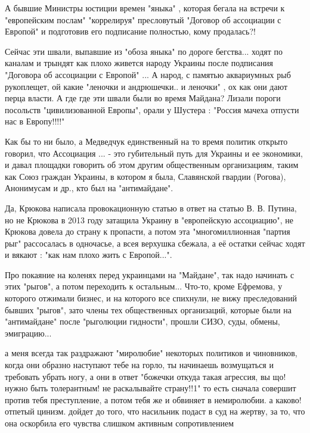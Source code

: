 \begin{itemize}
\begin{itemize}
А бывшие Министры юстиции времен "яныка" , которая бегала на встречи к
"европейским послам" "коррелируя" пресловутый "Договор об ассоциации с Европой"
и подготовив его подписание полностью, кому продалась?! 

Сейчас эти швали, выпавшие из "обоза яныка" по дороге бегства...  ходят по
каналам и трындят как плохо живется народу Украины после подписания "Договора
об ассоциации с Европой" ... А народ, с памятью аквариумных рыб рукоплещет, ой
какие "леночки и андрюшечки.. и леночки" , ох как они дают перца власти. А где
где эти швали были во время Майдана? Лизали пороги посольств "цивилизованной
Европы", орали у Шустера : "Россия мачеха отпусти нас в Европу!!!!" 

Как бы то ни было, а Медведчук единственный на то время политик открыто
говорил, что Ассоциация ... - это губительный путь для Украины и ее экономики,
и давал площадки говорить об этом другим общественным организациям, таким как
Союз граждан Украины, в котором я была, Славянской гвардии (Рогова), Анонимусам
и др., кто был на "антимайдане". 

Да, Крюкова написала провокационную статью в ответ на статью В. В. Путина, но
не Крюкова в 2013 году затащила Украину в "европейскую ассоциацию", не Крюкова
довела до страну к пропасти, а потом эта "многомиллионная "партия рыг"
рассосалась в одночасье, а всея верхушка сбежала, а её остатки сейчас ходят и
вякают : "как нам плохо жить с Европой...". 

Про покаяние на коленях перед украинцами на "Майдане", так надо начинать с этих
"рыгов", а потом переходить к остальным... Что-то, кроме Ефремова, у которого
отжимали бизнес, и на которого все спихнули, не вижу преследований бывших
"рыгов", зато члены тех общественных организаций, которые были на "антимайдане"
после "рыголюции гидности", прошли СИЗО, суды, обмены, эмиграцию...

\end{itemize}

 

а меня всегда так раздражают "миролюбие" некоторых политиков и чиновников,
когда они образно наступают тебе на горло, ты начинаешь возмущаться и требовать
убрать ногу, а они в ответ "божечки откуда такая агрессия, вы що! нужно быть
толерантным! не раскалывайте страну!!1" то есть сначала совершит против тебя
преступление, а потом тебя же и обвиняет в немиролюбии. а каково! отпетый
цинизм. дойдет до того, что насильник подаст в суд на жертву, за то, что она
оскорбила его чувства слишком активным сопротивлением



\end{itemize}
